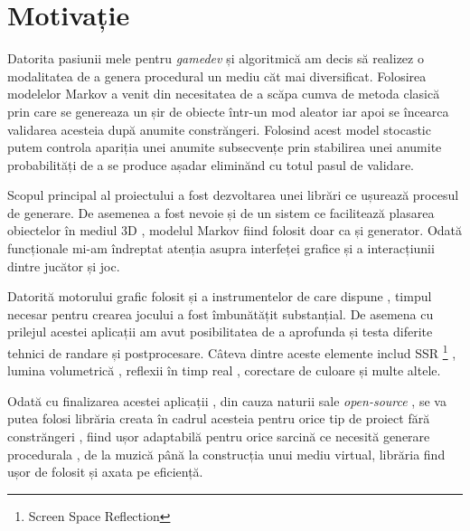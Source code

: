 \chapter*{Motivație} 

Datorita pasiunii mele pentru \textit{gamedev} și algoritmică am decis să realizez o modalitatea de a genera procedural un mediu căt mai diversificat. Folosirea modelelor Markov a venit din necesitatea de a scăpa cumva de metoda clasică prin care se genereaza un șir de obiecte într-un mod aleator iar apoi se încearca validarea acesteia după anumite constrăngeri. Folosind acest model stocastic putem controla apariția unei anumite subsecvențe prin stabilirea unei anumite probabilități de a se produce așadar eliminănd cu totul pasul de validare.\par

Scopul principal al proiectului a fost dezvoltarea unei librări ce ușurează procesul de generare. De asemenea a fost nevoie și de un sistem ce facilitează plasarea obiectelor în mediul 3D , modelul Markov fiind folosit doar ca și generator. Odată funcționale mi-am îndreptat atenția asupra interfeței grafice și a interacțiunii dintre jucător și joc.\par

Datorită motorului grafic folosit și a instrumentelor de care dispune , timpul necesar pentru crearea jocului a fost îmbunătățit substanțial. De asemena cu prilejul acestei aplicații am avut posibilitatea de a aprofunda și testa diferite tehnici de randare și postprocesare. Câteva dintre aceste elemente includ SSR \footnote{Screen Space Reflection} , lumina volumetrică  , reflexii în timp real , corectare de culoare și multe altele.\par

Odată cu finalizarea acestei aplicații , din cauza naturii sale \textit{open-source} , se va putea folosi librăria creata în cadrul acesteia pentru orice tip de proiect fără constrăngeri , fiind ușor adaptabilă pentru orice sarcină ce necesită generare procedurala , de la muzică până la construcția unui mediu virtual, librăria find ușor de folosit și axata pe eficiență.\par